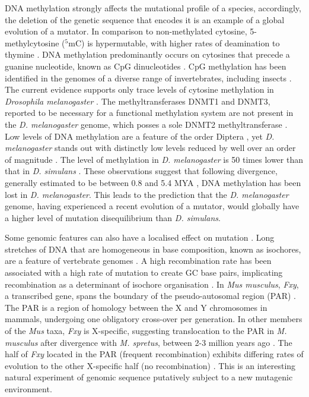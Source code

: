 DNA methylation strongly affects the mutational profile of a species, accordingly, the deletion of the genetic sequence that encodes it is an example of a global evolution of a mutator. In comparison to non-methylated cytosine, 5-methylcytosine ($^5$mC) is hypermutable, with higher rates of deamination to thymine \citep{Coulondre1978MolecularColi}. DNA methylation predominantly occurs on cytosines that precede a guanine nucleotide, known as CpG dinucleotides \citep{Holliday1975DNADevelopment}. CpG methylation has been identified in the genomes of a diverse range of invertebrates, including insects \citep{Wang2010EstimatingLoci}. The current evidence supports only trace levels of cytosine methylation in \textit{Drosophila melanogaster} \citep{Capuano2014CytosineSpecies, Deshmukh2018LevelsGenome}. The methyltransferases DNMT1 and DNMT3, reported to be necessary for a functional methylation system are not present in the \textit{D. melanogaster} genome, which posses a sole DNMT2 methyltransferase \citep{Goll2005EukaryoticMethyltransferases, Tweedie1999VestigesMelanogaster}. Low levels of DNA methylation are a feature of the order Diptera \citep{Bewick2017EvolutionInsects, Provataris2018SignaturesHolometabola}, yet \textit{D. melanogaster} stands out with distinctly low levels reduced by well over an order of magnitude \citep{Deshmukh2018LevelsGenome}. The level of methylation in \textit{D. melanogaster} is 50 times lower than that in \textit{D. simulans} \citep{Deshmukh2018LevelsGenome}. These observations suggest that following divergence, generally estimated to be between 0.8 and 5.4 MYA \citep{Cutter2008DivergenceRate, Wang2010EstimatingLoci, Tamura2004TemporalClocks}, DNA methylation has been lost in \textit{D. melanogaster}. This leads to the prediction that the \textit{D. melanogaster} genome, having experienced a recent evolution of a mutator, would globally have a higher level of mutation disequilibrium than \textit{D. simulans}. 
 
Some genomic features can also have a localised effect on mutation \citep{Lynch2016GeneticRate}. Long stretches of DNA that are homogeneous in base composition, known as isochores, are a feature of vertebrate genomes \citep{Bernardi1989TheGenome, Bernardi2000IsochoresVertebrates}. A high recombination rate has been associated with a high rate of mutation to create GC base pairs, implicating recombination as a determinant of isochore organisation \citep{Montoya-Burgos2003RecombinationGenomes}. In  \textit{Mus musculus}, \textit{Fxy}, a transcribed gene, spans the boundary of the pseudo-autosomal region (PAR) \citep{Palmer1997AMice}. The PAR is a region of homology between the X and Y chromosomes in mammals, undergoing one obligatory cross-over per generation.  In other members of the \textit{Mus} taxa, \textit{Fxy} is X-specific, suggesting translocation to the PAR in \textit{M. musculus} after divergence with \textit{M. spretus}, between 2-3 million years ago \citep{Huang2005HowMammals}. The half of \textit{Fxy} located in the PAR (frequent recombination) exhibits differing rates of evolution to the other X-specific half (no recombination) \citep{Perry1999EvolutionaryPosition}. This is an interesting natural experiment of genomic sequence putatively subject to a new mutagenic environment. 

